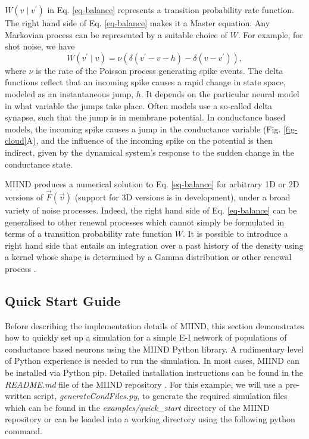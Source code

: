 \documentclass[utf8]{frontiersSCNS} %
\begin{document}
$W(v \mid v^{\prime})$ in Eq. \ref{eq-balance} represents a transition probability rate function. The right hand side of Eq. \ref{eq-balance} makes it a Master equation. Any Markovian process can be represented by a suitable choice of $W$. For example, for shot noise, we have
\begin{equation}   
\label{master_equation}
  W(v^{\prime} \mid v) = \nu (\delta (v^{\prime} - v - h)  - \delta( v - v^{\prime})),  
\end{equation}
where $\nu$ is the rate of the Poisson process generating spike events. The delta functions reflect that an incoming spike causes a rapid change in state space, modeled as an instantaneous jump, $h$. It depends on the particular neural model in what variable the jumps take place. Often models use a so-called delta synapse, such that the jump is in membrane potential. In conductance based models, the incoming spike causes a jump in the conductance variable (Fig. \ref{fig-cloud}A), and the influence of the incoming spike on the potential is then indirect, given by the dynamical system's response to the sudden change in the conductance state.

MIIND produces a numerical solution to Eq. \ref{eq-balance} for arbitrary 1D or 2D versions of $\vec{F}(\vec{v})$ (support for 3D versions is in development), under a broad variety of noise processes. Indeed, the right hand side of Eq. \ref{eq-balance} can be generalised to other renewal processes which cannot simply be formulated in terms of a transition probability rate function $W$. It is possible to introduce a right hand side that entails an integration over a past history of the density using a kernel whose shape is determined by a Gamma distribution or other renewal process \citep{lai2017population}.

\subsection{Quick Start Guide}
\label{section:quickstart}
Before describing the implementation details of MIIND, this section demonstrates how to quickly set up a simulation for a simple E-I network of populations of conductance based neurons using the MIIND Python library. A rudimentary level of Python experience is needed to run the simulation. In most cases, MIIND can be installed via Python pip. Detailed installation instructions can be found in the \textit{README.md} file of the MIIND repository \citep{miindwebsite}. For this example, we will use a pre-written script, \textit{generateCondFiles.py}, to generate the required simulation files which can be found in the \textit{examples/quick\_start} directory of the MIIND repository or can be loaded into a working directory using the following python command.
\end{document}
